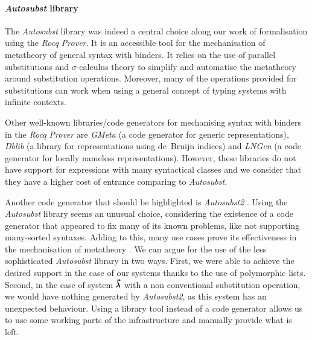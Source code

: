 \paragraph{\textit{Autosubst} library}
The \textit{Autosubst} library \cite{AutosubstSchafer} was indeed a central choice along our work of formalisation using the \textit{Rocq Prover}.
It is an accessible tool for the mechanisation of metatheory of general syntax with binders.
It relies on the use of parallel substitutions and $\sigma$-calculus theory to simplify and automatise the metatheory around substitution operations.
Moreover, many of the operations provided for substitutions can work when using a general concept of typing systems with infinite contexts.

Other well-known libraries/code generators for mechanising syntax with binders in the \textit{Rocq Prover} are \textit{GMeta} \cite{GMeta} (a code generator for generic representations), \textit{Dblib} \cite{Dblib} (a library for representations using de~Bruijn indices) and \textit{LNGen} \cite{LNGen} (a code generator for locally nameless representations).
However, these libraries do not have support for expressions with many syntactical classes and we consider that they have a higher cost of entrance comparing to \textit{Autosubst}.

Another code generator that should be highlighted is \textit{Autosubst2} \cite{Autosubst2}.
Using the \textit{Autosubst} library seems an unusual choice, considering the existence of a code generator that appeared to fix many of its known problems, like not supporting many-sorted syntaxes.
Adding to this, many use cases prove its effectiveness in the mechanisation of metatheory \cite{Forster2019,Dudenhefner2024}.
We can argue for the use of the less sophisticated \textit{Autosubst} library in two ways.
First, we were able to achieve the desired support in the case of our systems thanks to the use of polymorphic lists.
Second, in the case of system $\pmb{\vec \lambda}$ with a non conventional substitution operation, we would have nothing generated by \textit{Autosubst2}, as this system has an unexpected behaviour.
Using a library tool instead of a code generator allows us to use some working parts of the infrastructure and manually provide what is left.

